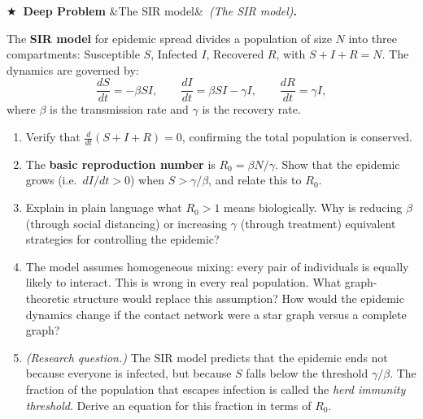 \documentclass[12pt, a4paper]{article}
\newcounter{problem}
\newcounter{deepproblem}
\newenvironment{deepproblem}[1][]{%
  \refstepcounter{deepproblem}%
  \par\vspace{6pt}%
  \noindent\textbf{\color{NavyBlue}$\bigstar$\ Deep Problem \thedeepproblem}%
  \ifx&#1&\else\ \textit{(#1)}\fi\textbf{.}\enskip
}{\par\vspace{4pt}}
\begin{document}
\begin{deepproblem}[The SIR model]
The \textbf{SIR model} for epidemic spread divides a population of size $N$ into three compartments: Susceptible $S$, Infected $I$, Recovered $R$, with $S + I + R = N$. The dynamics are governed by:
\[
  \frac{dS}{dt} = -\beta S I, \qquad
  \frac{dI}{dt} = \beta S I - \gamma I, \qquad
  \frac{dR}{dt} = \gamma I,
\]
where $\beta$ is the transmission rate and $\gamma$ is the recovery rate.
\begin{enumerate}[label=(\alph*)]
  \item Verify that $\frac{d}{dt}(S + I + R) = 0$, confirming the total population is conserved.
  \item The \textbf{basic reproduction number} is $R_0 = \beta N / \gamma$. Show that the epidemic grows (i.e.\ $dI/dt > 0$) when $S > \gamma/\beta$, and relate this to $R_0$.
  \item Explain in plain language what $R_0 > 1$ means biologically. Why is reducing $\beta$ (through social distancing) or increasing $\gamma$ (through treatment) equivalent strategies for controlling the epidemic?
  \item The model assumes homogeneous mixing: every pair of individuals is equally likely to interact. This is wrong in every real population. What graph-theoretic structure would replace this assumption? How would the epidemic dynamics change if the contact network were a star graph versus a complete graph?
  \item \textit{(Research question.)} The SIR model predicts that the epidemic ends not because everyone is infected, but because $S$ falls below the threshold $\gamma/\beta$. The fraction of the population that escapes infection is called the \emph{herd immunity threshold}. Derive an equation for this fraction in terms of $R_0$.
\end{enumerate}
\end{deepproblem}
\end{document}
